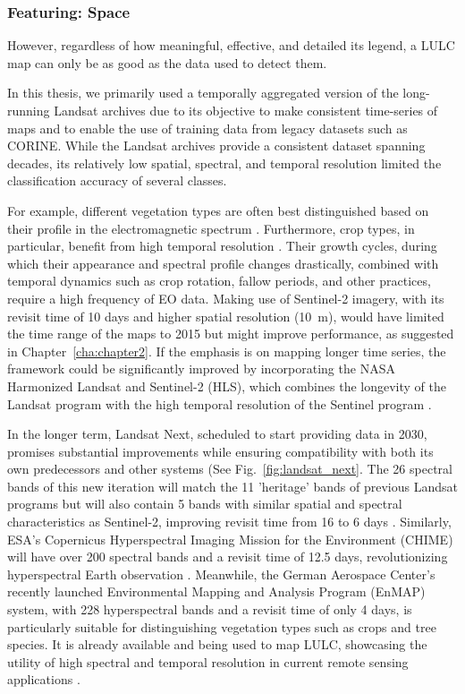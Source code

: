         \subsubsection{Featuring: Space}

            However, regardless of how meaningful, effective, and detailed its legend, a LULC map can only be as good as the data used to detect them. 
            
            In this thesis, we primarily used a temporally aggregated version of the long-running Landsat archives due to its objective to make consistent time-series of maps and to enable the use of training data from legacy datasets such as CORINE. While the Landsat archives provide a consistent dataset spanning decades, its relatively low spatial, spectral, and temporal resolution limited the classification accuracy of several classes. 
            
            For example, different vegetation types are often best distinguished based on their profile in the electromagnetic spectrum \citep{xu2021towards,hennessy2020hyperspectral, neinavaz2021thermal}. Furthermore, crop types, in particular, benefit from high temporal resolution \citep{esch2014differentiation,xu2021towards}. Their growth cycles, during which their appearance and spectral profile changes drastically, combined with temporal dynamics such as crop rotation, fallow periods, and other practices, require a high frequency of EO data. Making use of Sentinel-2 imagery, with its revisit time of 10 days and higher spatial resolution (10~m), would have limited the time range of the maps to 2015 but might improve performance, as suggested in Chapter\@~\ref{cha:chapter2}. If the emphasis is on mapping longer time series, the framework could be significantly improved by incorporating the NASA Harmonized Landsat and Sentinel-2 (HLS), which combines the longevity of the Landsat program with the high temporal resolution of the Sentinel program \citep{claverie2018harmonized}.
            
            In the longer term, Landsat Next, scheduled to start providing data in 2030, promises substantial improvements while ensuring compatibility with both its own predecessors and other systems (See Fig.\@~\ref{fig:landsat_next}. The 26 spectral bands of this new iteration will match the 11 'heritage' bands of previous Landsat programs but will also contain 5 bands with similar spatial and spectral characteristics as Sentinel-2, improving revisit time from 16 to 6 days \citep{landsatnext2023}. Similarly, ESA's Copernicus Hyperspectral Imaging Mission for the Environment (CHIME) will have over 200 spectral bands and a revisit time of 12.5 days, revolutionizing hyperspectral Earth observation \citep{nieke2023copernicus}. Meanwhile, the German Aerospace Center's recently launched Environmental Mapping and Analysis Program (EnMAP) system, with 228 hyperspectral bands and a revisit time of only 4 days, is particularly suitable for distinguishing vegetation types such as crops and tree species. It is already available and being used to map LULC, showcasing the utility of high spectral and temporal resolution in current remote sensing applications \citep{storch2023enmap, lekka2024appraisal}.
    
